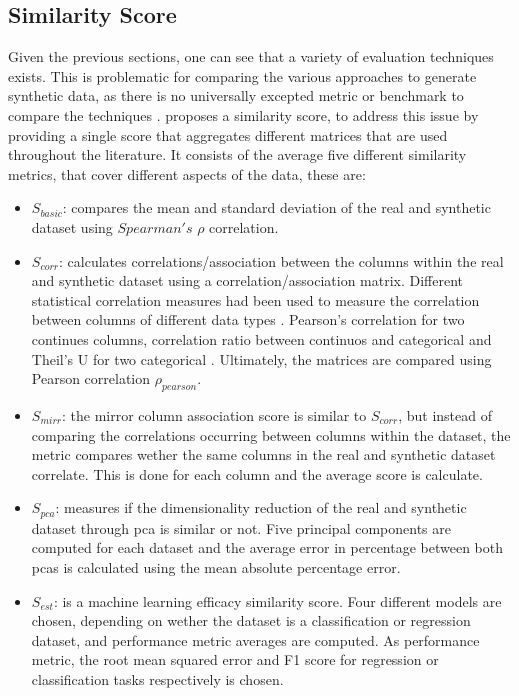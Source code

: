 \subsection{Similarity Score}
\label{ch:preliminaries-similarityScore}
Given the previous sections, one can see that a variety of evaluation techniques exists.
This is problematic for comparing the various approaches to generate synthetic data, as there is no universally excepted metric or benchmark to compare the techniques \cite{hernandez2022SyntheticDataGeneration, chundawat2022UniversalMetricRobust}.
\cite{brenninkmeijer2019GenerationEvaluationTabular} proposes a similarity score, to address this issue by providing a single score that aggregates different matrices that are used throughout the literature. 
It consists of the average five different similarity metrics, that cover different aspects of the data, these are:
\begin{itemize}
  \item $S_{basic}$: compares the mean and standard deviation of the real and synthetic dataset using $Spearman's$ $\rho$ \cite{lane2003IntroductionStatistics} correlation.
  \item $S_{corr}$: calculates correlations/association between the columns within the real and synthetic dataset using a correlation/association matrix. 
  Different statistical correlation measures had been used to measure the correlation between columns of different data types \cite[p. 37]{brenninkmeijer2019GenerationEvaluationTabular}.
  Pearson's correlation for two continues columns, correlation ratio between continuos and categorical and Theil's U for two categorical \cite{brenninkmeijer2019GenerationEvaluationTabular, lane2003IntroductionStatistics}.  
  Ultimately, the matrices are compared using Pearson correlation $\rho_{pearson}$.
  \item $S_{mirr}$: the mirror column association score is similar to $S_{corr}$, but instead of comparing the correlations occurring between columns within the dataset,
  the metric compares wether the same columns in the real and synthetic dataset correlate.
  This is done for each column and the average score is calculate.
  \item $S_{pca}$: measures if the dimensionality reduction of the real and synthetic dataset through \gls{pca} is similar or not.
  Five principal components are computed for each dataset and the average error in percentage between both \glspl{pca} is calculated using the mean absolute percentage error.
  \item $S_{est}$: is a machine learning efficacy similarity score. Four different models are chosen, depending on wether the dataset is a classification or regression dataset, and performance metric averages are computed.
  As performance metric, the root mean squared error and F1 score for regression or classification tasks respectively is chosen.
\end{itemize}



